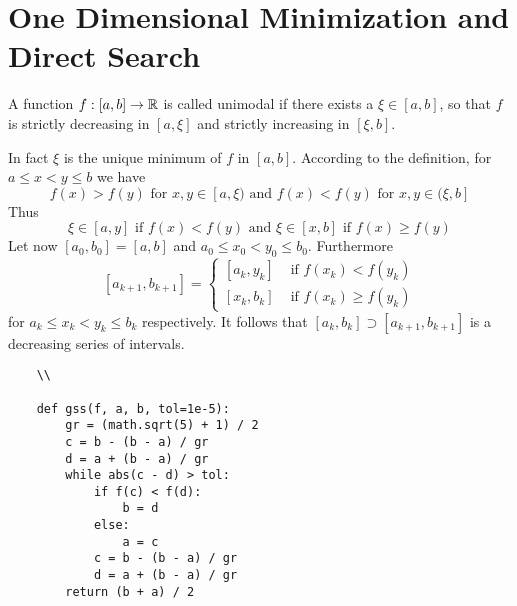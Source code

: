 
\newpage
\section{One Dimensional Minimization and Direct Search}


\label{def:unimodal_fnc}
A function \( f : [a,b] \to \mathbb{R} \) is called unimodal if there exists a \( \xi \in [a,b] \), so that
\( f \) is strictly decreasing in \( [a, \xi] \) and strictly increasing in \( [\xi, b] \).
\bigskip

In fact \( \xi \) is the unique minimum of \( f \) in \( [a, b] \). According to the definition, 
for \( a \le x < y \le b \) we have 
\[
    f(x) > f(y) \text{ for } x, y \in [a, \xi) \text{ and } f(x) < f(y) \text{ for }  x, y \in (\xi, b]
\]
Thus
\[
    \xi \in [a, y] \text{ if } f(x) < f(y) \text{ and } \xi \in [x, b] \text{ if } f(x) \ge f(y)
\]
Let now \( [a_0, b_0] = [a, b] \) and \(a_0 \le x_0 < y_0 \le b_0 \). Furthermore
\[
    [a_{k + 1}, b_{k + 1}] = 
        \begin{cases}
            [a_k, y_k] & \text{ if } f(x_k) < f(y_k)  \\
            [x_k, b_k] & \text{ if } f(x_k) \ge f(y_k)
        \end{cases}
\]
for \( a_k \le x_k < y_k \le b_k \) respectively. It follows that \( [a_k, b_k] \supset [a_{k + 1}, b_{k + 1}] \) 
is a decreasing series of intervals.
\bigskip

\bigskip
\begin{verbatim}
    \\

    def gss(f, a, b, tol=1e-5):
        gr = (math.sqrt(5) + 1) / 2
        c = b - (b - a) / gr
        d = a + (b - a) / gr 
        while abs(c - d) > tol:
            if f(c) < f(d):
                b = d
            else:
                a = c
            c = b - (b - a) / gr
            d = a + (b - a) / gr
        return (b + a) / 2

\end{verbatim}